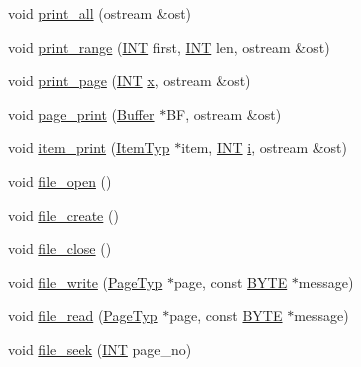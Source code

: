 \begin{DoxyCompactItemize}
\item 
void \mbox{\hyperlink{classbtree_a34c238b9ff5f8dcdf31948c0abba05ca}{print\+\_\+all}} (ostream \&ost)
\item 
void \mbox{\hyperlink{classbtree_afdde4b8008679f3c85b24b254a5ffdad}{print\+\_\+range}} (\mbox{\hyperlink{galois_8h_a09fddde158a3a20bd2dcadb609de11dc}{I\+NT}} first, \mbox{\hyperlink{galois_8h_a09fddde158a3a20bd2dcadb609de11dc}{I\+NT}} len, ostream \&ost)
\item 
void \mbox{\hyperlink{classbtree_a844ce0c89c957a300e1e67223252440d}{print\+\_\+page}} (\mbox{\hyperlink{galois_8h_a09fddde158a3a20bd2dcadb609de11dc}{I\+NT}} \mbox{\hyperlink{alphabet2_8_c_a6150e0515f7202e2fb518f7206ed97dc}{x}}, ostream \&ost)
\item 
void \mbox{\hyperlink{classbtree_ae6ffbcdff58a0c738d1a0e27a963da5d}{page\+\_\+print}} (\mbox{\hyperlink{discreta_8h_a4966414b761cd8d10ba385fe5e7c07fc}{Buffer}} $\ast$BF, ostream \&ost)
\item 
void \mbox{\hyperlink{classbtree_aca05a17e852f911cf7b1a971e7e7ad08}{item\+\_\+print}} (\mbox{\hyperlink{discreta_8h_a2fdd526928017b3784ac2ea203f31011}{Item\+Typ}} $\ast$item, \mbox{\hyperlink{galois_8h_a09fddde158a3a20bd2dcadb609de11dc}{I\+NT}} \mbox{\hyperlink{alphabet2_8_c_acb559820d9ca11295b4500f179ef6392}{i}}, ostream \&ost)
\item 
void \mbox{\hyperlink{classbtree_a17544d63a6ebcf6315a500af3d4e3837}{file\+\_\+open}} ()
\item 
void \mbox{\hyperlink{classbtree_a47acf76a2eff403d0367817b10938251}{file\+\_\+create}} ()
\item 
void \mbox{\hyperlink{classbtree_a5cf61e38102a281c4368d1621ab10915}{file\+\_\+close}} ()
\item 
void \mbox{\hyperlink{classbtree_ae5d8a2538af6625ee95573329c8e991b}{file\+\_\+write}} (\mbox{\hyperlink{discreta_8h_a433b49570cf2edc4c827e6442bd33998}{Page\+Typ}} $\ast$page, const \mbox{\hyperlink{galois_8h_ab6cc7b4aeb6ea31aba2b3fbfc83ff5e6}{B\+Y\+TE}} $\ast$message)
\item 
void \mbox{\hyperlink{classbtree_ab0b9bbc01c3d3836048934e90aec5f6c}{file\+\_\+read}} (\mbox{\hyperlink{discreta_8h_a433b49570cf2edc4c827e6442bd33998}{Page\+Typ}} $\ast$page, const \mbox{\hyperlink{galois_8h_ab6cc7b4aeb6ea31aba2b3fbfc83ff5e6}{B\+Y\+TE}} $\ast$message)
\item 
void \mbox{\hyperlink{classbtree_a829c985973c7c164fda2d81398e13504}{file\+\_\+seek}} (\mbox{\hyperlink{galois_8h_a09fddde158a3a20bd2dcadb609de11dc}{I\+NT}} page\+\_\+no)
\end{DoxyCompactItemize}
